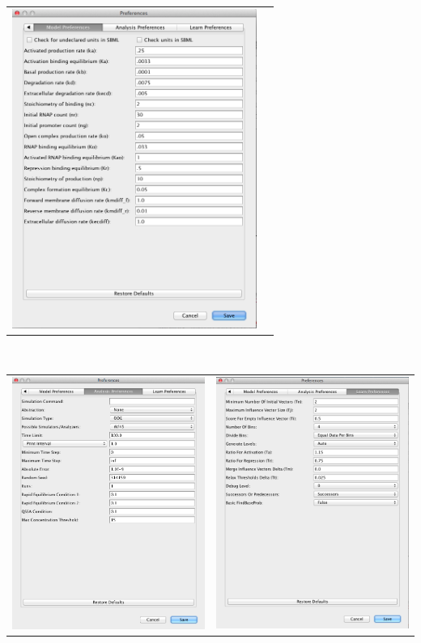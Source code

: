 \documentclass[titlepage,11pt]{article}
\begin{document}
\begin{center}
\begin{tabular}{cc}
\includegraphics[width=80mm]{screenshots/ModelPref}
\end{tabular} \\
\begin{tabular}{cc}
\includegraphics[width=80mm]{screenshots/AnaPref} &
\includegraphics[width=80mm]{screenshots/LearnPref}

\end{tabular}
\end{center}
\end{document}
